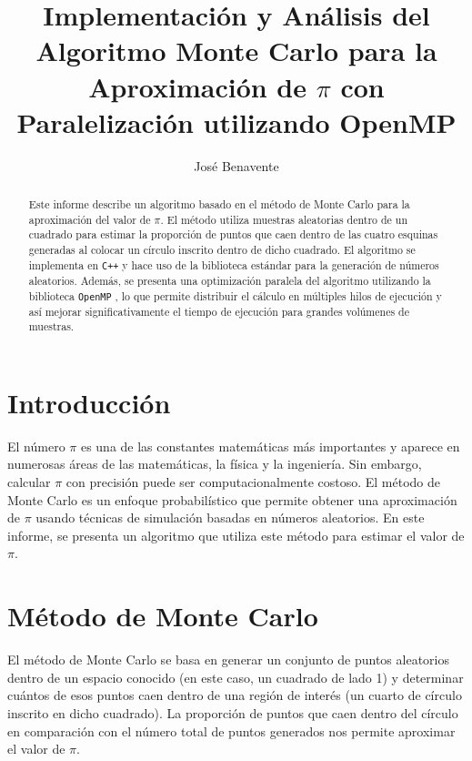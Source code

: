 \documentclass[a4paper, 10pt, onecolumn]{IEEEtran}
\begin{document}
  
  \title{Implementación y Análisis del Algoritmo Monte Carlo para la Aproximación de $\pi$ con Paralelización utilizando OpenMP}
  \author{José Benavente}
  \maketitle
  
  \newpage
  
  \tableofcontents
  
  \listoftables
  
  \listoffigures
  
  \lstlistoflistings
  
  \newpage


\begin{abstract}
Este informe describe un algoritmo basado en el método de Monte Carlo para la aproximación del valor de $\pi$. El método utiliza muestras aleatorias dentro de un cuadrado para estimar la proporción de puntos que caen dentro de las cuatro esquinas generadas al colocar un círculo inscrito dentro de dicho cuadrado. El algoritmo se implementa en \texttt{C++} y hace uso de la biblioteca estándar para la generación de números aleatorios. Además, se presenta una optimización paralela del algoritmo utilizando la biblioteca \texttt{OpenMP} \cite{openmp}, lo que permite distribuir el cálculo en múltiples hilos de ejecución y así mejorar significativamente el tiempo de ejecución para grandes volúmenes de muestras.
\end{abstract}

\section{Introducción}
El número $\pi$ es una de las constantes matemáticas más importantes y aparece en numerosas áreas de las matemáticas, la física y la ingeniería. Sin embargo, calcular $\pi$ con precisión puede ser computacionalmente costoso. El método de Monte Carlo es un enfoque probabilístico que permite obtener una aproximación de $\pi$ usando técnicas de simulación basadas en números aleatorios. En este informe, se presenta un algoritmo que utiliza este método para estimar el valor de $\pi$.

\section{Método de Monte Carlo}
El método de Monte Carlo se basa en generar un conjunto de puntos aleatorios dentro de un espacio conocido (en este caso, un cuadrado de lado 1) y determinar cuántos de esos puntos caen dentro de una región de interés (un cuarto de círculo inscrito en dicho cuadrado). La proporción de puntos que caen dentro del círculo en comparación con el número total de puntos generados nos permite aproximar el valor de $\pi$.
\end{document}

